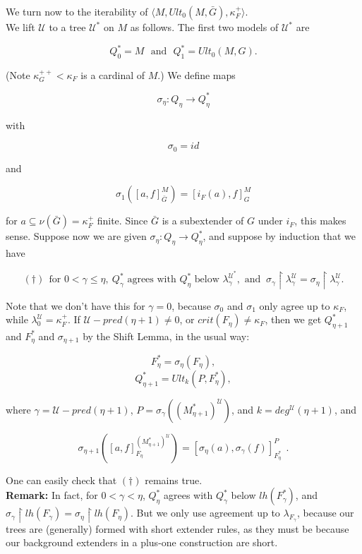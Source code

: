 \documentclass[12pt]{article}
\begin{document}
We turn now to the iterability of $\langle M, Ult_0 (M, \bar{G}), \kappa_F^+ \rangle$.\\

We lift $\mathscr{U}$ to a tree $\mathscr{U}^*$ on $M$ as follows.  The first two models of $\mathscr{U}^*$ are

\[
Q_0^* = M \ \ \ \text{and} \ \ \ Q_1^* = Ult_0 (M, G).
\]

(Note $\kappa_G^{++} < \kappa_F$ is a cardinal of $M$.)  We define maps

\[
\sigma_\eta : Q_\eta \longrightarrow Q_\eta^*
\]

with

\[
\sigma_0 = id
\]

and

\[
\sigma_1 ( [ a, f ]_{\bar{G}}^M ) = [ i_F (a) , f ]_G^M
\]

for $a \subseteq \nu ( \bar{G}) = \kappa_F^+$ finite.  Since $\bar{G}$ is a subextender of $G$ under $i_F$, this makes sense.  Suppose now we are given $\sigma_\eta : Q_\eta \longrightarrow Q_\eta^*$, and suppose by induction that we have 

\[
( \dagger ) \ \ \text{for } 0 < \gamma \leq \eta , \ Q_\gamma^* \text{ agrees with } Q_\eta^* \text{ below } \lambda_\gamma^{\mathscr{U}^*} , \text{ and }\ 
\sigma_\gamma \restriction \lambda_\gamma^{\mathscr{U}} = \sigma_\eta \restriction \lambda_\gamma^{\mathscr{U}}.
\]

Note that we don't have this for $\gamma = 0$, because $\sigma_0$ and $\sigma_1$ only agree up to $\kappa_F$, while $\lambda_0^{\mathscr{U}} = \kappa_F^+$.  If $\mathscr{U}-pred (\eta + 1) \neq 0$, or $crit (F_\eta) \neq \kappa_F$, then we get $Q_{\eta + 1}^*$ and $F_\eta^*$ and $\sigma_{\eta + 1}$ by the Shift Lemma, in the usual way:

\[
F_\eta^* = \sigma_\eta ( F_\eta ),
\]
\[
Q_{\eta + 1}^* = Ult_k (P, F_\eta^* ),
\]

where $\gamma = \mathscr{U}-pred (\eta + 1 )$, $P = \sigma_\gamma ( (M_{\eta +1}^*)^{\mathscr{U}} )$, and $k = deg^{\mathscr{U}} (\eta + 1)$, and

\[
\sigma_{\eta + 1} ( [a, f]_{F_\eta}^{(M_{\eta + 1}^* )^{\mathscr{U}}} ) = [ \sigma_\eta (a) , \sigma_\gamma (f) ]_{F_\eta^*}^P \ \ .
\]

One can easily check that $(\dagger)$ remains true.\\

\textbf{Remark:}  In fact, for $0 < \gamma < \eta$, $Q_\eta^*$ agrees with $Q_\gamma^*$ below $lh (F_\gamma^* )$, and $\sigma_\gamma \restriction lh (F_\gamma ) = \sigma_\eta \restriction lh (F_\eta )$.  But we only use agreement up to $\lambda_{F_\gamma }$, because our trees are (generally) formed with short extender rules, as they must be because our background extenders in a plus-one construction are short.
\end{document}
